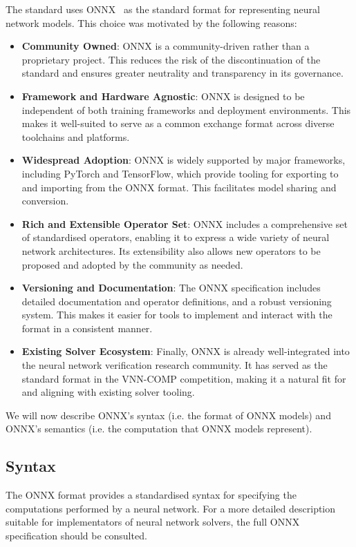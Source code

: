 The \vnnlib{} standard uses ONNX~\cite{onnxruntime} as the standard format for representing neural network models. This choice was motivated by the following reasons:
\begin{itemize}
\item \textbf{Community Owned}: ONNX is a community-driven rather than a proprietary project. This reduces the risk of the discontinuation of the standard and ensures greater neutrality and transparency in its governance.
\item \textbf{Framework and Hardware Agnostic}: ONNX is designed to be independent of both training frameworks and deployment environments. This makes it well-suited to serve as a common exchange format across diverse toolchains and platforms.
\item \textbf{Widespread Adoption}: ONNX is widely supported by major frameworks, including PyTorch and TensorFlow, which provide tooling for exporting to and importing from the ONNX format. This facilitates model sharing and conversion.
\item \textbf{Rich and Extensible Operator Set}: ONNX includes a comprehensive set of standardised operators, enabling it to express a wide variety of neural network architectures. Its extensibility also allows new operators to be proposed and adopted by the community as needed.

\item \textbf{Versioning and Documentation}: The ONNX specification includes detailed documentation and operator definitions, and a robust versioning system. This makes it easier for tools to implement and interact with the format in a consistent manner.

\item \textbf{Existing Solver Ecosystem}: Finally, ONNX is already well-integrated into the neural network verification research community. It has served as the standard format in the VNN-COMP competition, making it a natural fit for \vnnlib{} and aligning with existing solver tooling.
\end{itemize}
We will now describe ONNX's syntax (i.e. the format of ONNX models) and ONNX's semantics (i.e. the computation that ONNX models represent).

\subsection{Syntax}
\label{sec:onnx_overview}

The ONNX format provides a standardised syntax for specifying the computations performed by a neural network.
For a more detailed description suitable for implementators of neural network solvers, the full ONNX specification should be consulted. 

